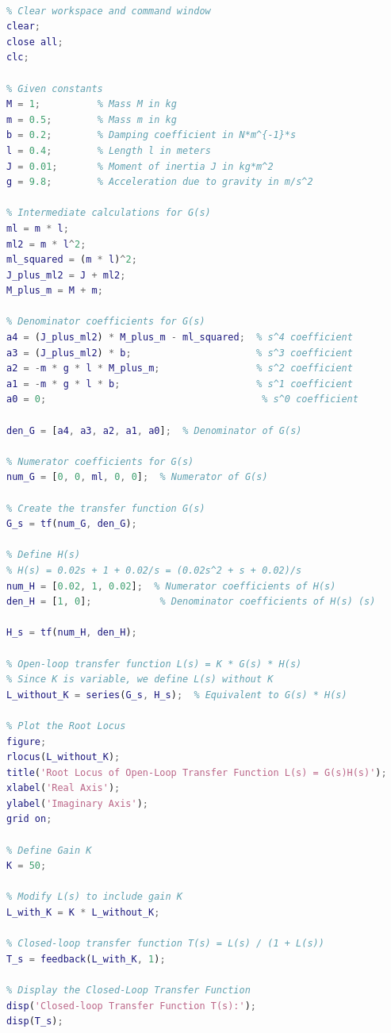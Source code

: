 \documentclass{article}
\begin{document}
\begin{lstlisting}[language=Matlab, caption={MATLAB Code for Root Locus and Closed-Loop Poles}]
% MATLAB code to plot the root locus and find closed-loop poles at K = 50

% Clear workspace and command window
clear;
close all;
clc;

% Given constants
M = 1;          % Mass M in kg
m = 0.5;        % Mass m in kg
b = 0.2;        % Damping coefficient in N*m^{-1}*s
l = 0.4;        % Length l in meters
J = 0.01;       % Moment of inertia J in kg*m^2
g = 9.8;        % Acceleration due to gravity in m/s^2

% Intermediate calculations for G(s)
ml = m * l;
ml2 = m * l^2;
ml_squared = (m * l)^2;
J_plus_ml2 = J + ml2;
M_plus_m = M + m;

% Denominator coefficients for G(s)
a4 = (J_plus_ml2) * M_plus_m - ml_squared;  % s^4 coefficient
a3 = (J_plus_ml2) * b;                      % s^3 coefficient
a2 = -m * g * l * M_plus_m;                 % s^2 coefficient
a1 = -m * g * l * b;                        % s^1 coefficient
a0 = 0;                                      % s^0 coefficient

den_G = [a4, a3, a2, a1, a0];  % Denominator of G(s)

% Numerator coefficients for G(s)
num_G = [0, 0, ml, 0, 0];  % Numerator of G(s)

% Create the transfer function G(s)
G_s = tf(num_G, den_G);

% Define H(s)
% H(s) = 0.02s + 1 + 0.02/s = (0.02s^2 + s + 0.02)/s
num_H = [0.02, 1, 0.02];  % Numerator coefficients of H(s)
den_H = [1, 0];            % Denominator coefficients of H(s) (s)

H_s = tf(num_H, den_H);

% Open-loop transfer function L(s) = K * G(s) * H(s)
% Since K is variable, we define L(s) without K
L_without_K = series(G_s, H_s);  % Equivalent to G(s) * H(s)

% Plot the Root Locus
figure;
rlocus(L_without_K);
title('Root Locus of Open-Loop Transfer Function L(s) = G(s)H(s)');
xlabel('Real Axis');
ylabel('Imaginary Axis');
grid on;

% Define Gain K
K = 50;

% Modify L(s) to include gain K
L_with_K = K * L_without_K;

% Closed-loop transfer function T(s) = L(s) / (1 + L(s))
T_s = feedback(L_with_K, 1);

% Display the Closed-Loop Transfer Function
disp('Closed-loop Transfer Function T(s):');
disp(T_s);


\end{lstlisting}
\end{document}
